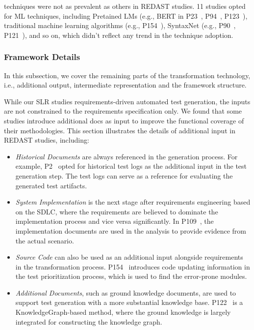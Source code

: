 
 techniques were not as prevalent as others in REDAST studies. 11 studies opted for ML techniques, including Pretained LMs (e.g., BERT in P23~, P94~, P123~), traditional machine learning algorithms (e.g., P154~), SyntaxNet (e.g., P90~, P121~), and so on, which didn't reflect any trend in the technique adoption.

\subsubsection{Framework Details}
In this subsection, we cover the remaining parts of the transformation technology, i.e., additional output, intermediate representation and the framework structure.



While our SLR studies requirements-driven automated test generation, the inputs are not constrained to the requirements specification only. We found that some studies introduce additional docs as input to improve the functional coverage of their methodologies. This section illustrates the details of additional input in REDAST studies, including:
\begin{itemize}
    \item \emph{Historical Documents} are always referenced in the generation process. For example, P2~ opted for historical test logs as the additional input in the test generation step. The test logs can serve as a reference for evaluating the generated test artifacts.
    \item \emph{System Implementation} is the next stage after requirements engineering based on the SDLC, where the requirements are believed to dominate the implementation process and vice versa significantly. In P109~, the implementation documents are used in the analysis to provide evidence from the actual scenario.
    \item \emph{Source Code} can also be used as an additional input alongside requirements in the transformation process. P154~ introduces code updating information in the test prioritization process, which is used to find the error-prone modules.
    \item \emph{Additional Documents}, such as ground knowledge documents, are used to support test generation with a more substantial knowledge base. P122~ is a KnowledgeGraph-based method, where the ground knowledge is largely integrated for constructing the knowledge graph.
\end{itemize}

